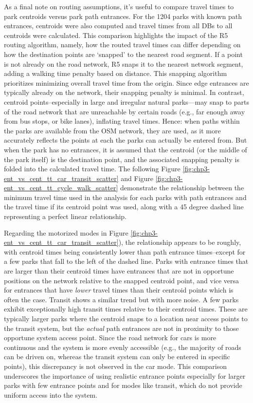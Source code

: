 \documentclass[
11pt, %
oneside, %
english, %
singlespacing, %
]{macthesis} %
\begin{document}
As a final note on routing assumptions, it's useful to compare travel times to park centroids versus park path entrances. For the 1204 parks with known path entrances, centroids were also computed and travel times from all DBs to all centroids were calculated. This comparison highlights the impact of the R5 routing algorithm, namely, how the routed travel times can differ depending on how the destination points are `snapped' to the nearest road segment. If a point is not already on the road network, R5 snaps it to the nearest network segment, adding a walking time penalty based on distance. This snapping algorithm prioritizes minimizing overall travel time from the origin. Since edge entrances are typically already on the network, their snapping penalty is minimal. In contrast, centroid points--especially in large and irregular natural parks---may snap to parts of the road network that are unreachable by certain roads (e.g., far enough away from bus stops, or bike lanes), inflating travel times. Hence: when paths within the parks are available from the OSM network, they are used, as it more accurately reflects the points at each the parks can actually be entered from. But when the park has no entrances, it is assumed that the centroid (or the middle of the park itself) is the destination point, and the associated snapping penalty is folded into the calculated travel time. The following Figure \ref{fig:chp3-ent_vs_cent_tt_car_transit_scatter} and Figure \ref{fig:chp3-ent_vs_cent_tt_cycle_walk_scatter} demonstrate the relationship between the minimum travel time used in the analysis for each parks with path entrances and the travel time if its centroid point was used, along with a 45 degree dashed line representing a perfect linear relationship.

Regarding the motorized modes in Figure \ref{fig:chp3-ent_vs_cent_tt_car_transit_scatter}), the relationship appears to be roughly, with centroid times being consistently lower than path entrance times--except for a few parks that fall to the left of the dashed line. Parks with entrance times that are larger than their centroid times have entrances that are not in opportune positions on the network relative to the snapped centroid point, and vice versa for entrances that have \emph{lower} travel times than their centroid points which is often the case. Transit shows a similar trend but with more noise. A few parks exhibit exceptionally high transit times relative to their centroid times. These are typically larger parks where the centroid snaps to a location near access points to the transit system, but the \emph{actual} path entrances are not in proximity to those opportune system access point. Since the road network for cars is more continuous and the system is more evenly accessible (e.g., the majority of roads can be driven on, whereas the transit system can only be entered in specific points), this discrepancy is not observed in the car mode. This comparison underscores the importance of using realistic entrance points especially for larger parks with few entrance points and for modes like transit, which do not provide uniform access into the system.
\end{document}

